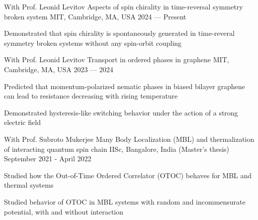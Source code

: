 

\begin{cventries}

\cventry
{With Prof. Leonid Levitov} %
{Aspects of spin chirality in time-reversal symmetry broken system} %
{MIT, Cambridge, MA, USA} %
{2024 --- Present} %
{
	\begin{cvitems} %
		\item{Demonstrated that spin chirality is spontaneously generated in time-reveral symmetry broken systems without any spin-orbit coupling}
	\end{cvitems}
}

\cventry
{With Prof. Leonid Levitov} %
{Transport in ordered phases in graphene} %
{MIT, Cambridge, MA, USA} %
{2023 --- 2024} %
{
	\begin{cvitems} %
		\item{Predicted that momentum-polarized nematic phases in biased bilayer graphene can lead to resistance decreasing with rising temperature}
		\item{Demonstrated hysteresis-like switching behavior under the action of a strong electric field}
	\end{cvitems}
}

\cventry
{With Prof. Subroto Mukerjee} %
{Many Body Localization (MBL) and thermalization of interacting quantum spin chain} %
{IISc, Bangalore, India \space \space\space\space\space\space\space\space\space\space\space\space\space(Master's thesis)} %
{September 2021 - April 2022} %
	{
		\begin{cvitems} %
			\item{Studied how the Out-of-Time Ordered Correlator (OTOC) behaves for MBL and thermal systems}
			\item{Studied behavior of OTOC in MBL systems with random and incommensurate potential, with and without interaction}
		\end{cvitems}
	}



\end{cventries}
